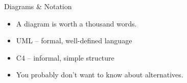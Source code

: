 \documentclass{slide}
\begin{document}
\begin{frame}{Diagrams \& Notation}

\Large{
\begin{itemize}
    \item<1-> A  diagram is worth a thousand words.
    \vspace{5mm}
    \item<2-> UML -- formal, well-defined language \cite{uml}
    \item<2-> C4 -- informal, simple structure \cite{brown2022c4}
    \vspace{2mm}
    \item<2-> You probably don't want to know about alternatives.
\end{itemize}
}

\end{frame}




\end{document}

